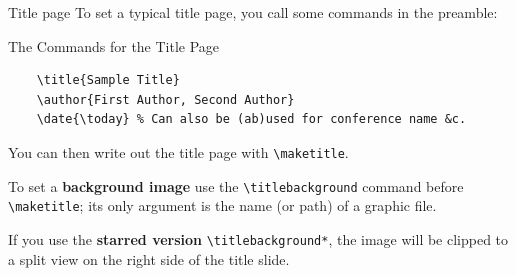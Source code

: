 \begin{frame}[fragile]{Title page}
	\vspace{0.5em}
    To set a typical title page, you call some commands in the preamble:
    \begin{block}{The Commands for the Title Page}
	\vspace{1em}
        \begin{verbatim}
    \title{Sample Title}
    \author{First Author, Second Author}
    \date{\today} % Can also be (ab)used for conference name &c.
        \end{verbatim}
    \end{block}
    You can then write out the title page with \verb|\maketitle|.

    To set a \textbf{background image} use the \verb|\titlebackground| command
    before \verb|\maketitle|; its only argument is the name (or path) of a graphic
    file.

    If you use the \textbf{starred version} \verb|\titlebackground*|, the image
    will be clipped to a split view on the right side of the title slide.
\end{frame}